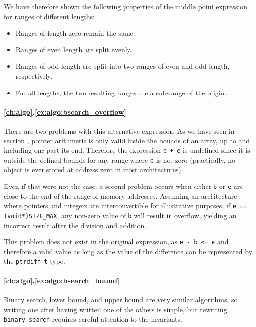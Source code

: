 We have therefore shown the following properties of the middle point expression
for ranges of different lengths:

\begin{itemize}
    \item Ranges of length zero remain the same.
    \item Ranges of even length are split evenly.
    \item
        Ranges of odd length are split into two ranges of even and odd length,
        respectively.
    \item
        For all lengths, the two resulting ranges are a sub-range of the
        original.
\end{itemize}

\paragraph{\ref{ch:algo}.\ref{ex:algo:bsearch_overflow}}

There are two problems with this alternative expression.  As we have seen in
section , pointer arithmetic is only valid inside the bounds of
an array, up to and including one past its end.  Therefore the expression
\texttt{b + e} is undefined since it is outside the defined bounds for any range
where \texttt{b} is not zero (practically, no object is ever stored at address
zero in most architectures).

Even if that were not the case, a second problem occurs when either \texttt{b}
or \texttt{e} are close to the end of the range of memory addresses.  Assuming
an architecture where pointers and integers are interconvertible for
illustrative purposes, if \texttt{e == (void*)SIZE\_MAX}, any non-zero value of
\texttt{b} will result in overflow, yielding an incorrect result after the
division and addition.

This problem does not exist in the original expression, as \texttt{e - b <= e}
and therefore a valid value as long as the value of the difference can be
represented by the \texttt{ptrdiff\_t} type.

\paragraph{\ref{ch:algo}.\ref{ex:algo:bsearch_bound}}

Binary search, lower bound, and upper bound are very similar algorithms, so
writing one after having written one of the others is simple, but rewriting
\texttt{binary\_search} requires careful attention to the invariants.

